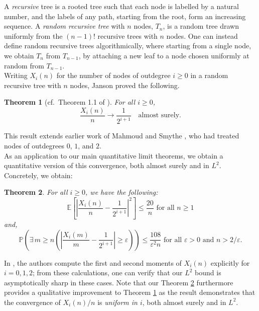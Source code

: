 \documentclass[12pt]{amsart}
\newtheorem{theorem}{Theorem}[section]
\theoremstyle{definition}
\theoremstyle{remark}
\newcommand{\PP}{\mathbb{P}}
\newcommand{\EE}{\mathbb{E}}
\begin{document}
A \emph{recursive} tree is a rooted tree such that each node is labelled by a natural number, and the labels of any path, starting from the root, form an increasing sequence. A \emph{random recursive tree} with $n$ nodes, $T_n$, is a random tree drawn uniformly from the $(n-1)!$ recursive trees with $n$ nodes. One can instead define random recursive trees algorithmically, where starting from a single node, we obtain $T_n$ from $T_{n-1}$, by attaching a new leaf to a node chosen uniformly at random from $T_{n-1}$.\\

Writing $X_i(n)$ for the number of nodes of outdegree $i \geq 0$ in a random recursive tree with $n$ nodes, Janson \cite{janson2005asymptotic} proved the following.

\begin{theorem}[{cf.\ Theorem 1.1 of \cite{janson2005asymptotic}}]
\label{thrm:jan}
    For all $i \geq 0$,
    \[
    \frac{X_i(n)}{n} \to \frac{1}{2^{i+1}} \quad \text{almost surely.}
    \]
\end{theorem}
This result extends earlier work of Mahmoud and Smythe \cite{mahmoud1992asymptotic}, who 
had treated nodes of outdegrees $0$, $1$, and $2$.\\

As an application to our main quantitative limit theorems, we obtain a quantitative version of this convergence, both almost surely and in $L^2$. Concretely, we obtain:
\begin{theorem}
\label{thrm:main:rec}
    For all $i \geq 0$, we have the following:
    \[
    \EE\left[\left|\frac{X_i(n)}{n} - \frac{1}{2^{i+1}}\right|^2\right] 
    \leq \frac{20}{n} \mbox{ for all } n \geq 1
    \]
    and,
    \[
    \PP\left(\exists\, m \geq n \left(\left|\frac{X_i(m)}{m} 
    - \frac{1}{2^{i+1}}\right| \geq \varepsilon\right)\right) 
    \leq \frac{108}{\varepsilon^2n} \mbox{ for all } \varepsilon >0 \mbox{ and } n > 2/\varepsilon.
    \]
\end{theorem}

In \cite[Section 3]{mahmoud1992asymptotic}, the authors compute the first and 
second moments of $X_i(n)$ explicitly for $i = 0, 1, 2$; from these calculations, 
one can verify that our $L^2$ bound is asymptotically sharp in these cases. Note that our Theorem \ref{thrm:main:rec} furthermore provides a qualitative improvement to Theorem \ref{thrm:jan} as the result demonstrates that the 
convergence of $X_i(n)/n$ is \emph{uniform in $i$}, both almost surely and in $L^2$.\\
\end{document}
